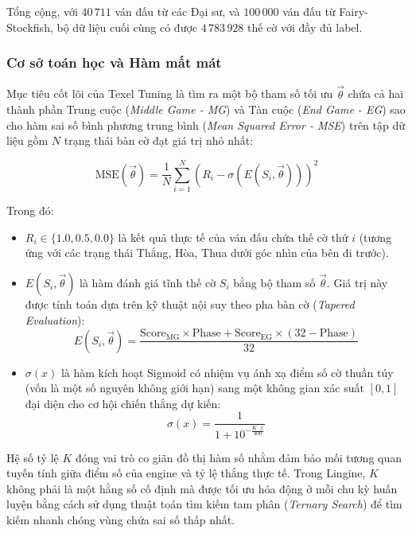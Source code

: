 Tổng cộng, với $40\,711$ ván đấu từ các Đại sư, và $100\,000$ ván đấu từ Fairy-Stockfish, bộ dữ liệu cuối cùng có được $4\,783\,928$ thế cờ với đầy đủ label.

\subsubsection{Cơ sở toán học và Hàm mất mát}

Mục tiêu cốt lõi của Texel Tuning là tìm ra một bộ tham số tối ưu $\vec{\theta}$ chứa cả hai thành phần Trung cuộc (\textit{Middle Game - MG}) và Tàn cuộc (\textit{End Game - EG}) sao cho hàm sai số bình phương trung bình (\textit{Mean Squared Error - MSE}) trên tập dữ liệu gồm $N$ trạng thái bàn cờ đạt giá trị nhỏ nhất:

\begin{equation}
\text{MSE}(\vec{\theta}) = \frac{1}{N} \sum_{i=1}^{N} \left( R_i - \sigma\left(E(S_i, \vec{\theta})\right) \right)^2
\end{equation}

Trong đó:
\begin{itemize}
    \item $R_i \in \{1.0, 0.5, 0.0\}$ là kết quả thực tế của ván đấu chứa thế cờ thứ $i$ (tương ứng với các trạng thái Thắng, Hòa, Thua dưới góc nhìn của bên đi trước).
    \item $E(S_i, \vec{\theta})$ là hàm đánh giá tĩnh thế cờ $S_i$ bằng bộ tham số $\vec{\theta}$. Giá trị này được tính toán dựa trên kỹ thuật nội suy theo pha bàn cờ (\textit{Tapered Evaluation}):
    \begin{equation}
    E(S_i, \vec{\theta}) = \frac{\text{Score}_{\text{MG}} \times \text{Phase} + \text{Score}_{\text{EG}} \times (32 - \text{Phase})}{32}
    \end{equation}
    \item $\sigma(x)$ là hàm kích hoạt Sigmoid có nhiệm vụ ánh xạ điểm số cờ thuần túy (vốn là một số nguyên không giới hạn) sang một không gian xác suất $[0, 1]$ đại diện cho cơ hội chiến thắng dự kiến:
    \begin{equation}
    \sigma(x) = \frac{1}{1 + 10^{-\frac{K \cdot x}{400}}}
    \end{equation}
\end{itemize}

Hệ số tỷ lệ $K$ đóng vai trò co giãn đồ thị hàm số nhằm đảm bảo mối tương quan tuyến tính giữa điểm số của engine và tỷ lệ thắng thực tế. Trong Lingine, $K$ không phải là một hằng số cố định mà được tối ưu hóa động ở mỗi chu kỳ huấn luyện bằng cách sử dụng thuật toán tìm kiếm tam phân (\textit{Ternary Search}) để tìm kiếm nhanh chóng vùng chứa sai số thấp nhất.

